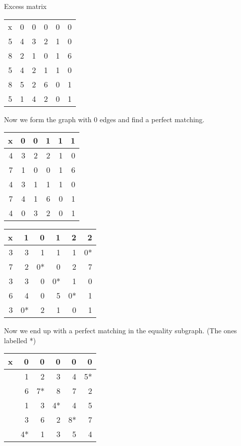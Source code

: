 \documentclass[11pt]{article}
\begin{document}
Excess matrix
\begin{center}
\begin{tabular}{rrrrrr}
x & 0 & 0 & 0 & 0 & 0\\
5 & 4 & 3 & 2 & 1 & 0\\
8 & 2 & 1 & 0 & 1 & 6\\
5 & 4 & 2 & 1 & 1 & 0\\
8 & 5 & 2 & 6 & 0 & 1\\
5 & 1 & 4 & 2 & 0 & 1\\
\end{tabular}
\end{center}

Now we form the graph with \(0\) edges and find a perfect matching.

\begin{center}
\begin{tabular}{rrrrrr}
x & 0 & 0 & 1 & 1 & 1\\
\hline
4 & 3 & 2 & 2 & 1 & 0\\
7 & 1 & 0 & 0 & 1 & 6\\
4 & 3 & 1 & 1 & 1 & 0\\
7 & 4 & 1 & 6 & 0 & 1\\
4 & 0 & 3 & 2 & 0 & 1\\
\end{tabular}
\end{center}

\begin{center}
\begin{tabular}{rrrrrr}
x & 1 & 0 & 1 & 2 & 2\\
\hline
3 & 3 & 1 & 1 & 1 & 0*\\
7 & 2 & 0* & 0 & 2 & 7\\
3 & 3 & 0 & 0* & 1 & 0\\
6 & 4 & 0 & 5 & 0* & 1\\
3 & 0* & 2 & 1 & 0 & 1\\
\end{tabular}
\end{center}

Now we end up with a perfect matching in the equality subgraph. (The ones
labelled *)

\begin{center}
\begin{tabular}{lrrrrr}
x & 0 & 0 & 0 & 0 & 0\\
\hline
 & 1 & 2 & 3 & 4 & 5*\\
 & 6 & 7* & 8 & 7 & 2\\
 & 1 & 3 & 4* & 4 & 5\\
 & 3 & 6 & 2 & 8* & 7\\
 & 4* & 1 & 3 & 5 & 4\\
\end{tabular}
\end{center}
\end{document}

